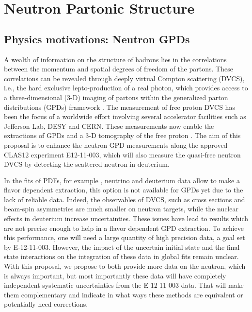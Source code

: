 \chapter{Neutron Partonic Structure}
\label{chap:physics}

\section{Physics motivations: Neutron GPDs}

A wealth of information on the structure of hadrons lies in the correlations 
between the momentum and spatial degrees of freedom of the partons. These 
correlations can be revealed through deeply virtual Compton scattering (DVCS), 
i.e., the hard exclusive lepto-production of a real photon, which provides 
access to a three-dimensional (3-D) imaging of partons within the generalized 
parton distributions (GPDs) framework 
\cite{Mueller:1998fv,
Ji:1996ek,
PhysRevD.55.7114,
Radyushkin:1996nd,
PhysRevD.56.5524}. The measurement of free proton DVCS has been the focus of a 
worldwide effort \cite{PhysRevLett.87.182002,
   PhysRevLett.87.182001,
   PhysRevD.75.011103,
   Girod:2007aa,
   PhysRevC.92.055202,
   PhysRevLett.99.242501,
   PhysRevC.80.035206,
   PhysRevLett.114.032001,
   Jo:2015ema}
involving several accelerator facilities such as Jefferson Lab, DESY and  
CERN. These measurements now enable the extractions of GPDs and a 3-D 
tomography of the free proton \cite{Guidal:2013rya, PhysRevD.95.011501}. The 
aim of this proposal is to enhance the neutron GPD measurements along the 
approved CLAS12 experiment E12-11-003, which will also measure the quasi-free 
neutron DVCS by detecting the scattered neutron in deuterium.  

In the fits of PDFs, for example \cite{Ball:2014uwa} , neutrino and deuterium 
data allow to make a flavor dependent extraction, this option is not available 
for GPDs yet due to the lack of reliable data. Indeed, the observables of DVCS, 
such as cross sections and beam-spin asymmetries are much smaller on neutron 
targets, while the nuclear effects in deuterium increase uncertainties. These 
issues have lead to results \cite{Mazouz:2007aa} which are not precise enough 
to help in a flavor dependent GPD extraction. To achieve this performance, one 
will need a large quantity of high precision data, a goal set by E-12-11-003.  
However, the impact of the uncertain initial state and the final state 
interactions on the integration of these data in global fits remain unclear.  
With this proposal, we propose to both provide more data on the neutron,
which is always important, but most importantly these data will have completely 
independent systematic uncertainties from the E-12-11-003 data. That will make 
them complementary and indicate in what ways these methods are equivalent or 
potentially need corrections.

